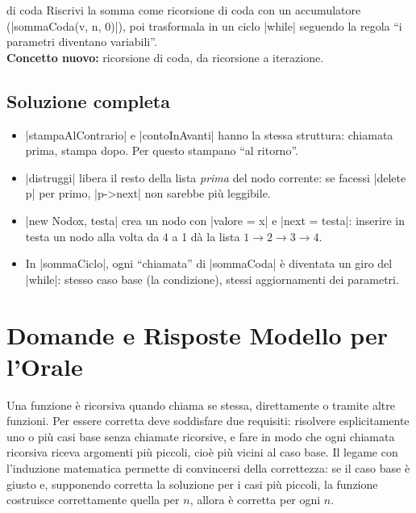 \begin{step}{di coda}
Riscrivi la somma come ricorsione di coda con un accumulatore
(\cc|sommaCoda(v, n, 0)|), poi trasformala in un ciclo \cc|while| seguendo la
regola ``i parametri diventano variabili''.\\[0.3em]
\textbf{Concetto nuovo:} ricorsione di coda, da ricorsione a iterazione.
\end{step}

\subsection*{Soluzione completa}

\begin{consiglio}
\begin{itemize}
  \item \cc|stampaAlContrario| e \cc|contoInAvanti| hanno la stessa struttura: chiamata
        prima, stampa dopo. Per questo stampano ``al ritorno''.
  \item \cc|distruggi| libera il resto della lista \emph{prima} del nodo corrente: se
        facessi \cc|delete p| per primo, \cc|p->next| non sarebbe più leggibile.
  \item \cc|new Nodo{x, testa}| crea un nodo con \cc|valore = x| e \cc|next = testa|:
        inserire in testa un nodo alla volta da 4 a 1 dà la lista $1 \to 2 \to 3 \to 4$.
  \item In \cc|sommaCiclo|, ogni ``chiamata'' di \cc|sommaCoda| è diventata un giro del
        \cc|while|: stesso caso base (la condizione), stessi aggiornamenti dei
        parametri.
\end{itemize}
\end{consiglio}

\section{Domande e Risposte Modello per l'Orale}

\begin{orale}
Una funzione è ricorsiva quando chiama se stessa, direttamente o tramite altre
funzioni. Per essere corretta deve soddisfare due requisiti: risolvere
esplicitamente uno o più casi base senza chiamate ricorsive, e fare in modo che ogni
chiamata ricorsiva riceva argomenti più piccoli, cioè più vicini al caso base. Il
legame con l'induzione matematica permette di convincersi della correttezza: se il
caso base è giusto e, supponendo corretta la soluzione per i casi più piccoli, la
funzione costruisce correttamente quella per $n$, allora è corretta per ogni $n$.
\end{orale}

